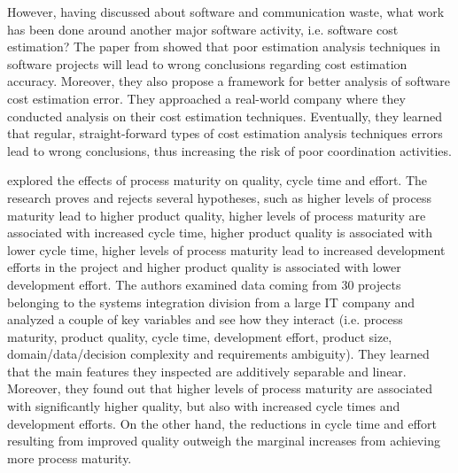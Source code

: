 \documentclass{mprop}
\begin{document}
However, having discussed about software and communication waste, what work has been done
around another major software activity, i.e. software cost estimation? The paper from 
\citet{grimstad2006framework} showed that poor estimation analysis techniques
in software projects will lead to wrong conclusions regarding cost estimation accuracy.
Moreover, they also propose a framework for better analysis of software cost estimation
error. They approached a real-world company where they conducted analysis on their cost
estimation techniques. Eventually, they learned that regular, straight-forward types
of cost estimation analysis techniques errors lead to wrong conclusions, thus increasing
the risk of poor coordination activities.

\citet{harter2000effects} explored the effects of process maturity on quality, cycle time and effort. The
research proves and rejects several hypotheses, such as higher levels of process maturity lead 
to higher product quality, higher levels of process maturity are associated with increased cycle time,
higher product quality is associated with lower cycle time, higher levels of process maturity lead 
to increased development efforts in the project and higher product quality is associated with lower
development effort. The authors examined data coming from 30 projects belonging to the systems 
integration division from a large IT company and analyzed a couple of key variables and see how
they interact (i.e. process maturity, product quality, cycle time, development effort, product
size, domain/data/decision complexity and requirements ambiguity). They learned that the main
features they inspected are additively separable and linear. Moreover, they found out that 
higher levels of process maturity are associated with significantly higher quality, but also
with increased cycle times and development efforts. On the other hand, the reductions in cycle
time and effort resulting from improved quality outweigh the marginal increases from achieving
more process maturity. 
\end{document}
